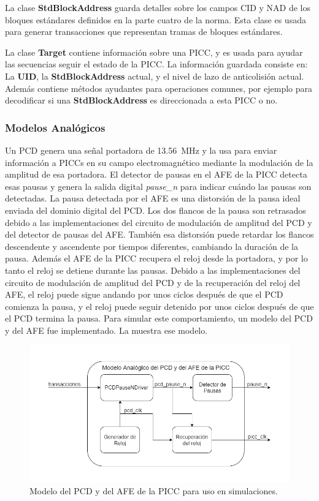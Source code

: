 \documentclass[a4paper, twoside, 11pt]{report}
\begin{document}
La clase \textbf{StdBlockAddress} guarda detalles sobre los campos CID y NAD de los bloques estándares definidos en la parte cuatro de la norma. Esta clase es usada para generar transacciones que representan tramas de bloques estándares.

La clase \textbf{Target} contiene información sobre una PICC, y es usada para ayudar las secuencias seguir el estado de la PICC. La información guardada consiste en: La \textbf{UID}, la \textbf{StdBlockAddress} actual, y el nivel de lazo de anticolisión actual. Además contiene métodos ayudantes para operaciones comunes, por ejemplo para decodificar si una \textbf{StdBlockAddress} es direccionada a esta PICC o no.

\FloatBarrier
\subsubsection{Modelos Analógicos}

Un PCD genera una señal portadora de \SI{13.56}{\mega\hertz} y la usa para enviar información a PICCs en su campo electromagnético mediante la modulación de la amplitud de esa portadora. El detector de pausas en el AFE de la PICC detecta esas pausas y genera la salida digital \textit{pause\_n} para indicar cuándo las pausas son detectadas. La pausa detectada por el AFE es una distorsión de la pausa ideal enviada del dominio digital del PCD. Los dos flancos de la pausa son retrasados debido a las implementaciones del circuito de modulación de amplitud del PCD y del detector de pausas del AFE. También esa distorsión puede retardar los flancos descendente y ascendente por tiempos diferentes, cambiando la duración de la pausa. Además el AFE de la PICC recupera el reloj desde la portadora, y por lo tanto el reloj se detiene durante las pausas. Debido a las implementaciones del circuito de modulación de amplitud del PCD y de la recuperación del reloj del AFE, el reloj puede sigue andando por unos ciclos después de que el PCD comienza la pausa, y el reloj puede seguir detenido por unos ciclos después de que el PCD termina la pausa. Para simular este comportamiento, un modelo del PCD y del AFE fue implementado. La  muestra ese modelo.

\begin{figure}[htb]
  \centering
  \includegraphics[width=1.0\textwidth]{./img/analogue_model}
  \caption{Modelo del PCD y del AFE de la PICC para uso en simulaciones.}
  \label{fig:analog_model}
\end{figure}
\end{document}
